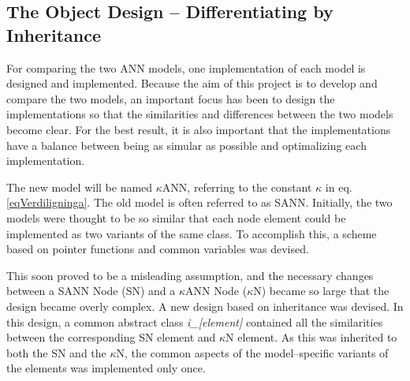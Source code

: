 	\subsection{The Object Design -- Differentiating by Inheritance} %

	For comparing the two ANN models, one implementation of each model is designed and implemented. 
	Because the aim of this project is to develop and compare the two models, an important focus has been to design the implementations so that the similarities and differences between the two models become clear.
	For the best result, it is also important that the implementations have a balance between being as simular as possible and optimalizing each implementation. %

	The new model will be named $\kappa$ANN, referring to the constant $\kappa$ in eq. \eqref{eqVerdiligninga}. The old model is often referred to as SANN.
	Initially, the two models were thought to be so similar that each node element could be implemented as two variants of the same class.
	To accomplish this, a scheme based on pointer functions and common variables was devised.

	This soon proved to be a misleading assumption, and the necessary changes between a SANN Node (SN) and a $\kappa$ANN Node ($\kappa$N) became so large that the design became overly complex.
	A new design based on inheritance was devised.
	In this design, a common abstract class \emph{i\_[element]} contained all the similarities between the corresponding SN element and $\kappa$N element.
	As this was inherited to both the SN and the $\kappa$N, the common aspects of the model--specific variants of the elements was implemented only once.

